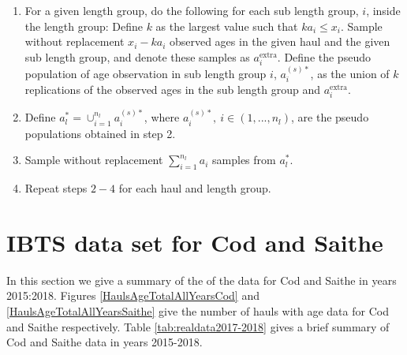 \documentclass[a4paper 12pt]{article}
\numberwithin{equation}{section}
\begin{document}
\begin{enumerate}
\item For a given length group, do the following for each sub length group, $i$, inside the length group: Define $k$ as the largest value such that $ka_{i} \leq x_{i}$. Sample without replacement $x_{i} - k a_{i}$ observed ages in the given haul and the given sub length group, and denote these samples as $a^{\mathrm{extra}}_{i}$. Define the pseudo population of age observation in sub length group $i$, $a^{(s)*}_{i}$, as the union of $k$ replications of the observed ages in the sub length group and $a^{\mathrm{extra}}_{i}$.

\item Define $a^{*}_{l} = \cup_{i = 1}^{n_{l}} a^{(s)*}_{i} $, where $a^{(s)*}_{i}, \ i \in \left(1,...,n_{l} \right)$, are the pseudo populations obtained in step 2.

\item Sample without replacement $\sum_{i = 1}^{n_{l}} a_{i}$ samples from $a^{*}_{l} $.

\item Repeat steps $2-4$ for each haul and length group.
\end{enumerate}

\clearpage
\section{\large IBTS data set for Cod and Saithe}
\label{secAp:data}

In this section we give a summary of the of the data for Cod and Saithe in years 2015:2018. Figures \ref{HaulsAgeTotalAllYearsCod} and \ref{HaulsAgeTotalAllYearsSaithe} give the number of hauls with age data for Cod and Saithe respectively. Table \ref{tab:realdata2017-2018} gives a brief summary of Cod and Saithe data in years 2015-2018.\\
\end{document}
